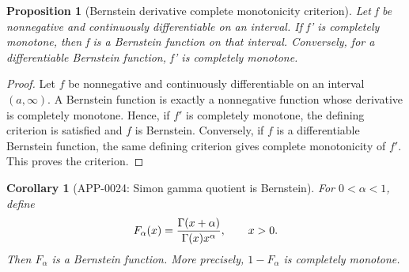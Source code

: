 \documentclass[11pt]{article}
\numberwithin{equation}{section}
\newtheorem{proposition}[theorem]{Proposition}
\newtheorem{corollary}[theorem]{Corollary}
\theoremstyle{definition}
\theoremstyle{remark}
\newcommand{\1}{\mathbf 1}
\begin{document}
\begin{proposition}[Bernstein derivative complete monotonicity criterion]
\label{res:bernstein-derivative-complete-monotonicity-criterion}
Let f be nonnegative and continuously differentiable on an interval. If f' is completely monotone, then f is a Bernstein function on that interval. Conversely, for a differentiable Bernstein function, f' is completely monotone.
\end{proposition}

\begin{proof}
Let \(f\) be nonnegative and continuously differentiable on an interval \((a,\infty)\). A Bernstein function is exactly a nonnegative function whose derivative is completely monotone. Hence, if \(f'\) is completely monotone, the defining criterion is satisfied and \(f\) is Bernstein. Conversely, if \(f\) is a differentiable Bernstein function, the same defining criterion gives complete monotonicity of \(f'\). This proves the criterion.
\end{proof}

\begin{corollary}[APP-0024: Simon gamma quotient is Bernstein]
\label{thm:app24-simon-gamma-quotient}
For \(0<\alpha<1\), define
\[
  F_\alpha(x)={\Gamma(x+\alpha)\over \Gamma(x)x^\alpha},
  \qquad x>0 .
\]
Then \(F_\alpha\) is a Bernstein function.  More precisely,
\(1-F_\alpha\) is completely monotone.


\end{corollary}
\end{document}
